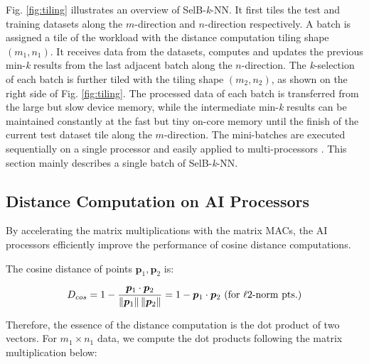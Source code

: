\documentclass[12pt]{extbook}
\begin{document}
Fig. \ref{fig:tiling} illustrates an overview of SelB-\textit{k}-NN. It first tiles the test and training datasets along the $m$-direction and $n$-direction respectively. A batch is assigned a tile of the workload with the distance computation tiling shape $(m_1, n_1)$. It receives data from the datasets, computes and updates the previous min-\textit{k} results from the last adjacent batch along the $n$-direction. The \textit{k}-selection of each batch is further tiled with the tiling shape $(m_2, n_2)$, as shown on the right side of Fig. \ref{fig:tiling}. The processed data of each batch is transferred from the large but slow device memory, while the intermediate min-\textit{k} results can be maintained constantly at the fast but tiny on-core memory until the finish of the current test dataset tile along the $m$-direction. The mini-batches are executed sequentially on a single processor and easily applied to multi-processors \cite{van2007superlinear}. This section mainly describes a single batch of SelB-\textit{k}-NN.

\subsection{Distance Computation on AI Processors}

By accelerating the matrix multiplications with the matrix MACs, the AI processors efficiently improve the performance of cosine distance computations. 

The cosine distance of points $\boldsymbol{p}_{1}, \boldsymbol{p}_{2}$ is:

\begin{equation}
    \label{eq:cosine}
    \begin{aligned}
    D_{cos} = 1 - \frac{\boldsymbol{p}_{1} \cdot \boldsymbol{p}_{2}}
            {\left\| \boldsymbol{p}_{1} \right\| 
                \left\| \boldsymbol{p}_{2} \right\|}
        = 1 - \boldsymbol{p}_{1} \cdot \boldsymbol{p}_{2}\  (\textnormal{for } \ell\textnormal{2-norm pts.})
    \end{aligned}
    \end{equation}

Therefore, the essence of the distance computation is the dot product of two vectors. For $m_1 \times n_1$ data, we compute the dot products following the matrix multiplication below:
\end{document}

